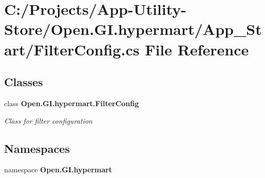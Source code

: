 \section{C\+:/\+Projects/\+App-\/\+Utility-\/\+Store/\+Open.G\+I.\+hypermart/\+App\+\_\+\+Start/\+Filter\+Config.cs File Reference}
\label{_filter_config_8cs}
\subsection*{Classes}
\begin{DoxyCompactItemize}
\item 
class \textbf{ Open.\+G\+I.\+hypermart.\+Filter\+Config}
\begin{DoxyCompactList}\small\item\em Class for filter configuration \end{DoxyCompactList}\end{DoxyCompactItemize}
\subsection*{Namespaces}
\begin{DoxyCompactItemize}
\item 
namespace \textbf{ Open.\+G\+I.\+hypermart}
\end{DoxyCompactItemize}
